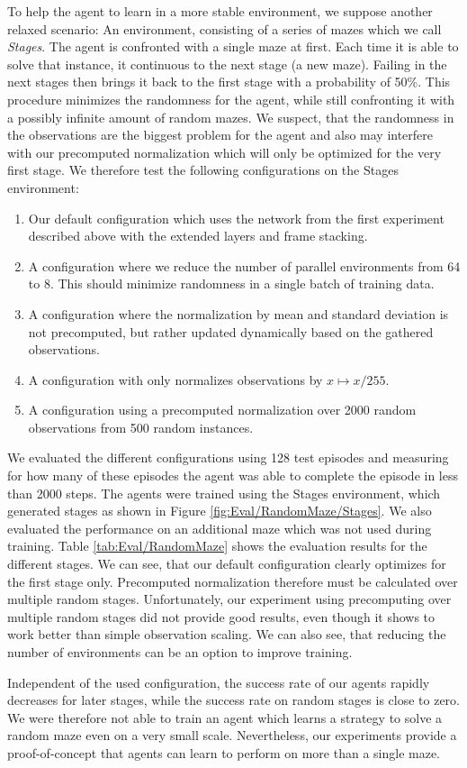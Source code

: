 To help the agent to learn in a more stable environment, we suppose another relaxed scenario: An environment, consisting of a series of mazes which we call \textit{Stages}. The agent is confronted with a single maze at first. Each time it is able to solve that instance, it continuous to the next stage (a new maze). Failing in the next stages then brings it back to the first stage with a probability of 50\%. This procedure minimizes the randomness for the agent, while still confronting it with a possibly infinite amount of random mazes. We suspect, that the randomness in the observations are the biggest problem for the agent and also may interfere with our precomputed normalization which will only be optimized for the very first stage. We therefore test the following configurations on the Stages environment:

\begin{enumerate}
    \item Our default configuration which uses the network from the first experiment described above with the extended layers and frame stacking. 
    \item A configuration where we reduce the number of parallel environments from 64 to 8. This should minimize randomness in a single batch of training data.
    \item A configuration where the normalization by mean and standard deviation is not precomputed, but rather updated dynamically based on the gathered observations.
    \item A configuration with only normalizes observations by $x \mapsto x / 255$.
    \item A configuration using a precomputed normalization over 2000 random observations from 500 random instances.
\end{enumerate}

We evaluated the different configurations using 128 test episodes and measuring for how many of these episodes the agent was able to complete the episode in less than 2000 steps. The agents were trained using the Stages environment, which generated stages as shown in Figure \ref{fig:Eval/RandomMaze/Stages}. We also evaluated the performance on an additional maze which was not used during training. Table \ref{tab:Eval/RandomMaze} shows the evaluation results for the different stages. We can see, that our default configuration clearly optimizes for the first stage only. Precomputed normalization therefore must be calculated over multiple random stages. Unfortunately, our experiment using precomputing over multiple random stages did not provide good results, even though it shows to work better than simple observation scaling. We can also see, that reducing the number of environments can be an option to improve training. 

Independent of the used configuration, the success rate of our agents rapidly decreases for later stages, while the success rate on random stages is close to zero. We were therefore not able to train an agent which learns a strategy to solve a random maze even on a very small scale. Nevertheless, our experiments provide a proof-of-concept that agents can learn to perform on more than a single maze.